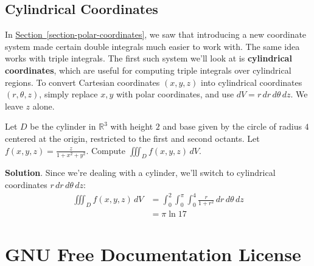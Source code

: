 \documentclass[10pt,]{book}
\newcommand{\terminology}[1]{\textbf{#1}}
\theoremstyle{ptxplainnotitle}
\theoremstyle{ptxplaintitle}
\theoremstyle{ptxplainnotitle}
\theoremstyle{ptxplaintitle}
\theoremstyle{ptxplainnotitle}
\theoremstyle{ptxplaintitle}
\theoremstyle{ptxdefinitionnotitle}
\theoremstyle{ptxdefinitiontitle}
\theoremstyle{ptxdefinitionnotitle}
\theoremstyle{ptxdefinitiontitle}
\theoremstyle{ptxdefinitionnotitle}
\theoremstyle{ptxdefinitiontitle}
\theoremstyle{ptxdefinitionnotitle}
\theoremstyle{ptxdefinitiontitle}
\theoremstyle{ptxdefinitionnotitle}
\theoremstyle{ptxdefinitiontitle}
\numberwithin{equation}{section}
\newcommand{\RR}{\mathbb{R}}
\begin{document}
\section[{Cylindrical Coordinates}]{Cylindrical Coordinates}\label{section-cylindrical-coordinates}
\hypertarget{p-1177}{}%
In \hyperref[section-polar-coordinates]{Section~\ref{section-polar-coordinates}}, we saw that introducing a new coordinate system made certain double integrals much easier to work with. The same idea works with triple integrals. The first such system we'll look at is \terminology{cylindrical coordinates}, which are useful for computing triple integrals over cylindrical regions. To convert Cartesian coordinates \((x,y,z)\) into cylindrical coordinates \((r,\theta,z)\), simply replace \(x,y\) with polar coordinates, and use \(dV = r\,dr\,d\theta\,dz\). We leave \(z\) alone.%
\begin{example}\label{example-computing-a-triple-integral-over-a-cylinder}
\hypertarget{p-1178}{}%
Let \(D\) be the cylinder in \(\RR^{3}\) with height \(2\) and base given by the circle of radius \(4\) centered at the origin, restricted to the first and second octants. Let \(f(x,y,z) = \frac{z}{1+x^{2}+y^{2}}\). Compute \(\iiint_{D}f(x,y,z)\,dV\).%
\par\smallskip%
\noindent\textbf{Solution}.\hypertarget{solution-190}{}\quad%
\hypertarget{p-1179}{}%
Since we're dealing with a cylinder, we'll switch to cylindrical coordinates \(r\,dr\,d\theta\,dz\):%
\begin{align*}
\iiint_{D}f(x,y,z)\,dV & = \int_{0}^{2}\int_{0}^{\pi}\int_{0}^{4}\frac{r}{1+r^{2}}\,dr\,d\theta\,dz \\
& = \pi\ln17 
\end{align*}
%
\end{example}
%
%
%
\appendix
%
\typeout{************************************************}
\typeout{************************************************}
\chapter[{GNU Free Documentation License}]{GNU Free Documentation License}\label{appendix-gfdl}
\typeout{************************************************}
\typeout{************************************************}
\end{document}
